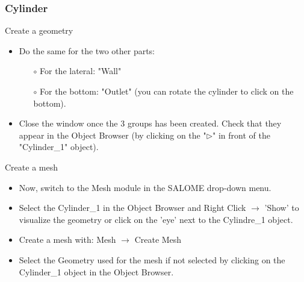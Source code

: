 \documentclass[10pt]{beamer}
\begin{document}
\begin{frame}
\frametitle{Cylinder}

\begin{block}{Create a geometry}
\begin{itemize}
\item Do the same for the two other parts:
    \begin{itemize}
    \item [$\circ$] For the lateral: "Wall"
    \item [$\circ$] For the bottom: "Outlet" (you can rotate the cylinder to click on the bottom).
    \end{itemize}
\item Close the window once the 3 groups has been created. Check that they appear in the Object Browser (by clicking on the "$\triangleright$" in front of the "Cylinder\_1" object).
\end{itemize}
\end{block}

\begin{block}{Create a mesh}
\begin{itemize}
\item \label{salome_mesh} Now, switch to the Mesh module in the SALOME drop-down menu.
\item Select the Cylinder\_1 in the Object Browser and Right Click $\rightarrow$ 'Show' to visualize the geometry or click on the 'eye' next to the Cylindre\_1 object.
\item Create a mesh with: Mesh $\rightarrow$ Create Mesh
\item Select the Geometry used for the mesh if not selected by clicking on the Cylinder\_1 object in the Object Browser.
\end{itemize}
\end{block}

\end{frame}
\end{document}
